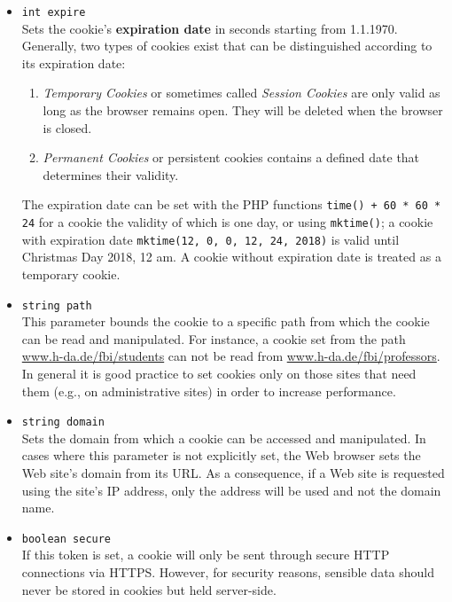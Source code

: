 \documentclass[a4paper, justified, notoc]{tufte-handout} %
\begin{document}
\begin{itemize}
	\item \texttt{int expire} \\Sets the cookie's \textbf{expiration date} in seconds starting from 1.1.1970. Generally, two types of cookies exist that can be distinguished according to its expiration date: 
	\begin{enumerate}
		\item \emph{Temporary Cookies} or sometimes called \emph{Session Cookies} are only valid as long as the browser remains open. They will be deleted when the browser is closed.
		\item \emph{Permanent Cookies} or persistent cookies contains a defined date that determines their validity.
	\end{enumerate}
	The expiration date can be set with the PHP functions \texttt{time() + 60 * 60 * 24} for a cookie the validity of which is one day, or using \texttt{mktime()}; a cookie with expiration date \texttt{mktime(12, 0, 0, 12, 24, 2018)} is valid until Christmas Day 2018, 12 am.
	A cookie without expiration date is treated as a temporary cookie.
	
	\item \texttt{string path} \\ This parameter bounds the cookie to a specific path from which the cookie can be read and manipulated. For instance, a cookie set from the path \url{www.h-da.de/fbi/students} can not be read from \url{www.h-da.de/fbi/professors}. 
	In general it is good practice to set cookies only on those sites that need them (e.g., on administrative sites) in order to increase performance. 
	
	\item \texttt{string domain} \\ Sets the domain from which a cookie can be accessed and manipulated. In cases where this parameter is not explicitly set, the Web browser sets the Web site's domain from its URL. As a consequence, if a Web site is requested using the site's IP address, only the address will be used and not the domain name. 
	
	\item \texttt{boolean secure} \\ If this token is set, a cookie will only be sent through secure HTTP connections via HTTPS. However, for security reasons, sensible data should never be stored in cookies but held server-side. 
	

\end{itemize}
\end{document}
